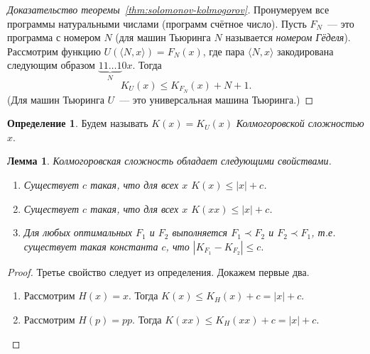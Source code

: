 \documentclass[12pt]{article}
\theoremstyle{definition}
\newtheorem{definition}{Определение}[section]
\theoremstyle{plain}
\newtheorem{lemma}{Лемма}[section]
\theoremstyle{remark}
\begin{document}
\begin{proof}[Доказательство теоремы~\ref{thm:solomonov-kolmogorov}]
    Пронумеруем все программы натуральными числами (программ счётное число). Пусть $F_N$~— 
    это программа с номером $N$ (для машин Тьюринга $N$ называется \emph{номером Гёделя}). 
    Рассмотрим функцию $U(\langle N, x\rangle) = F_N(x)$, где пара $\langle
    N,x\rangle$ закодирована следующим образом $\underbrace{11\dots1}_{N}0x$.
    Тогда 
    \[
        K_U(x)\le K_{F_N}(x) + N + 1.
    \]
    (Для машин Тьюринга $U$~--- это универсальная машина Тьюринга.)
\end{proof}
\begin{definition}
    Будем называть $K(x) = K_U(x)$ \emph{Колмогоровской сложностью $x$}.
\end{definition}

\begin{lemma} Колмогоровская сложность обладает следующими свойствами.
\begin{enumerate}
    \item Существует $c$ такая, что для всех $x$ $K(x)\le |x| + c$. 
    \item Существует $c$ такая, что для всех $x$ $K(xx)\le |x| + c$.
    \item Для любых оптимальных $F_1$ и $F_2$ выполняется $F_1\prec F_2$ и $F_2\prec F_1$,
        т.е. существует такая константа $c$, что 
        \(
            |K_{F_1} - K_{F_2}| \le c.            
        \)
\end{enumerate}
\end{lemma}
\begin{proof} Третье свойство следует из определения. Докажем первые два.
\begin{enumerate}
    \item Рассмотрим $H(x) = x$. Тогда
        \(K(x)\le K_H(x) + c = |x| + c.\)
    \item Рассмотрим $H(p) = pp$. Тогда
        \(K(xx)\le K_H(xx) + c = |x| + c.\)
\end{enumerate}
\end{proof}
\end{document}
